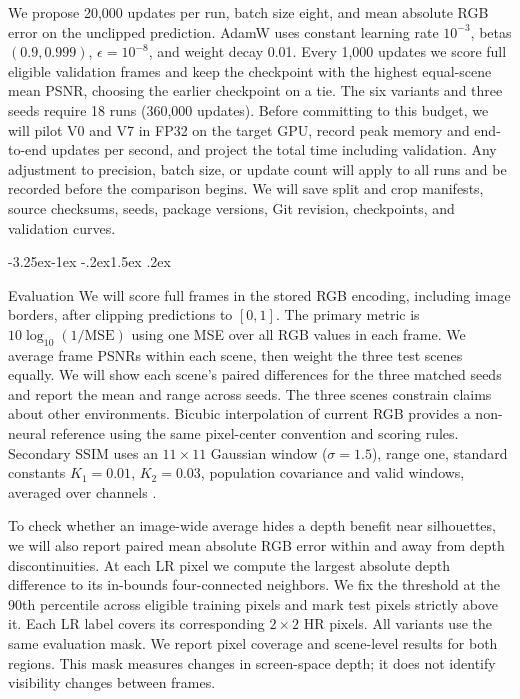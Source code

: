 \documentclass[11pt,a4paper]{article}
\makeatletter
\renewcommand\subsection{\@startsection{subsection}{2}{\z@}%
  {-3.25ex\@plus -1ex \@minus -.2ex}{1.5ex \@plus .2ex}%
  {\normalfont\large\bfseries\raggedright}}
\makeatother
\begin{document}
We propose 20,000 updates per run, batch size eight, and mean absolute
RGB error on the unclipped prediction. AdamW uses constant learning rate
$10^{-3}$, betas $(0.9,0.999)$, $\epsilon=10^{-8}$, and weight decay
0.01. Every 1,000 updates we score full eligible validation frames and
keep the checkpoint with the highest equal-scene mean PSNR, choosing the
earlier checkpoint on a tie. The six variants and three seeds require
18 runs (360,000 updates). Before committing to this budget, we will
pilot V0 and V7 in FP32 on the target GPU, record peak memory
and end-to-end updates per second, and project the total time including
validation. Any adjustment to precision, batch size, or update count will
apply to all runs and be recorded before the comparison begins. We will
save split and crop manifests, source checksums, seeds, package versions,
Git revision, checkpoints, and validation curves.

\subsection{Evaluation}
\label{sec:metrics}
We will score full frames in the stored RGB encoding, including image
borders, after clipping predictions to $[0,1]$. The primary metric is
$10\log_{10}(1/\mathrm{MSE})$ using one MSE over all RGB values in
each frame. We average frame PSNRs within each scene, then weight the
three test scenes equally. We will show each scene's paired differences
for the three matched seeds and report the mean and range across seeds.
The three scenes constrain claims about other environments. Bicubic
interpolation of current RGB provides a non-neural reference using the
same pixel-center convention and scoring rules. Secondary SSIM uses
an $11\times11$ Gaussian window ($\sigma=1.5$), range one, standard
constants $K_1=0.01$, $K_2=0.03$, population covariance and valid windows,
averaged over channels \cite{wang2004ssim}.

To check whether an image-wide average hides a depth benefit near
silhouettes, we will also report paired mean absolute RGB error within
and away from depth discontinuities. At each LR pixel we compute the
largest absolute depth difference to its in-bounds four-connected
neighbors. We fix the threshold at the 90th percentile across eligible
training pixels and mark test pixels strictly above it. Each LR label
covers its corresponding $2\times2$ HR pixels. All variants use the
same evaluation mask. We report pixel coverage and scene-level results
for both regions. This mask measures changes in screen-space depth;
it does not identify visibility changes between frames.
\end{document}
